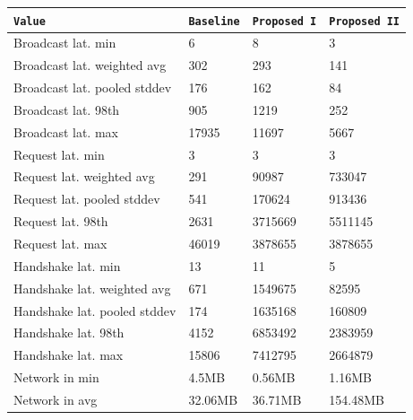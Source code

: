 \documentclass{uvamscse}
\begin{document}
\begin{table}[H]
\begin{center}
\begin{tabular}{llll}
  \texttt{Value}                & \texttt{Baseline}   & \texttt{Proposed I}  & \texttt{Proposed II} \\
  \hline
  Broadcast lat. min            & 6                   & 8                    & 3              \\
  Broadcast lat. weighted avg   & 302                 & 293                  & 141              \\
  Broadcast lat. pooled stddev  & 176                 & 162                  & 84              \\
  Broadcast lat. 98th           & 905                 & 1219                 & 252              \\
  Broadcast lat. max            & 17935               & 11697                & 5667              \\
  \hline
  Request lat. min              & 3                   & 3                    & 3              \\
  Request lat. weighted avg     & 291                 & 90987                & 733047              \\
  Request lat. pooled stddev    & 541                 & 170624               & 913436              \\
  Request lat. 98th             & 2631                & 3715669              & 5511145              \\
  Request lat. max              & 46019               & 3878655              & 3878655              \\
  \hline
  Handshake lat. min            & 13                  & 11                   & 5             \\
  Handshake lat. weighted avg   & 671                 & 1549675              & 82595             \\
  Handshake lat. pooled stddev  & 174                 & 1635168              & 160809              \\
  Handshake lat. 98th           & 4152                & 6853492              & 2383959             \\
  Handshake lat. max            & 15806               & 7412795              & 2664879             \\
  \hline
  Network in min                & 4.5MB               & 0.56MB               & 1.16MB             \\
  Network in avg                & 32.06MB             & 36.71MB              & 154.48MB             \\

\end{tabular}
\end{center}
\end{table}
\end{document}
